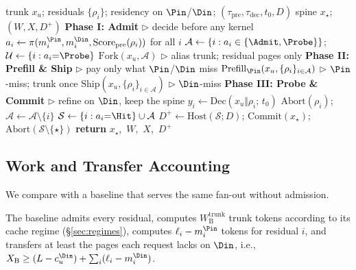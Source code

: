 \begin{algorithm}[t]
\caption{\sys{} (one fan-out).
Actions follow \eqref{eq:action}; costs follow \eqref{eq:work}--\eqref{eq:dec}.}
\label{alg:app}
\small
\begin{algorithmic}[1]
\REQUIRE trunk $x_u$; residuals $\{\rho_i\}$; residency on $\Pin$/$\Din$; $(\tau_{\mathrm{pre}},\tau_{\mathrm{dec}},t_0,D)$
\ENSURE spine $x_\star$; $(W,X,D^{+})$
\STATE
\STATE \textbf{Phase I: Admit} \hfill \(\triangleright\) decide before any kernel
\STATE $a_i\leftarrow\pi(m_i^{\Pin},m_i^{\Din},\mathrm{Score}_{\mathrm{pre}}(\rho_i))$ for all $i$
\STATE $\mathcal{A}\leftarrow\{i:a_i\in\{\Admit,\Probe\}\}$;\;
  $\mathcal{U}\leftarrow\{i:a_i{=}\Probe\}$
\STATE $\mathrm{Fork}(x_u,\mathcal{A})$ \hfill \(\triangleright\) alias trunk; residual pages only
\STATE
\STATE \textbf{Phase II: Prefill \& Ship} \hfill \(\triangleright\) pay only what $\Pin$/$\Din$ miss
\STATE $\mathrm{Prefill}_{\Pin}(x_u,\{\rho_i\}_{i\in\mathcal{A}})$ \hfill \(\triangleright\) $\Pin$-miss; trunk once
\STATE $\mathrm{Ship}(x_u,\{\rho_i\}_{i\in\mathcal{A}})$ \hfill \(\triangleright\) $\Din$-miss
\STATE
\STATE \textbf{Phase III: Probe \& Commit} \hfill \(\triangleright\) refine on $\Din$, keep the spine
  \STATE $y_i\leftarrow\mathrm{Dec}(x_u\Vert\rho_i;\,t_0)$
    \STATE $\mathrm{Abort}(\rho_i)$;\; $\mathcal{A}\leftarrow\mathcal{A}\setminus\{i\}$
  \ENDIF
\ENDFOR
\STATE $\mathcal{S}\leftarrow\{i:a_i{=}\Hit\}\cup\mathcal{A}$
\STATE $D^{+}\leftarrow\mathrm{Host}(\mathcal{S};D)$;\;
  $\mathrm{Commit}(x_\star)$;\;
  $\mathrm{Abort}(\mathcal{S}\setminus\{\star\})$
\STATE \textbf{return} $x_\star$,\ $W$,\ $X$,\ $D^{+}$
\end{algorithmic}
\end{algorithm}

\subsection{Work and Transfer Accounting}
\label{sec:accounting}

We compare \sys with a baseline that serves the same fan-out without admission.

\begin{assumption}[Baseline]
\label{ass:baseline}
The baseline admits every residual, computes $W_{\mathrm{B}}^{\mathrm{trunk}}$ trunk tokens according to its cache regime (\S\ref{sec:regimes}), computes $\ell_i-m_i^{\Pin}$ tokens for residual $i$, and transfers at least the pages each request lacks on $\Din$, i.e., $X_{\mathrm{B}}\ge(L-c_u^{\Din})+\sum_i(\ell_i-m_i^{\Din})$.
\end{assumption}

